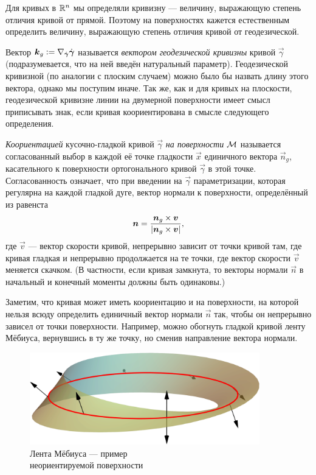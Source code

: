 Для кривых в $\R^n$ мы определяли кривизну --- величину, выражающую степень отличия кривой от прямой. Поэтому на поверхностях кажется естественным определить величину, выражающую степень отличия кривой от геодезической.

Вектор $\vec{k}_g \vcentcolon = \nabla_{\dot{\vec{\gamma}}}\dot{\vec{\gamma}}$ называется \textit{вектором геодезической кривизны} кривой $\vec{\gamma}$ (подразумевается, что на ней введён натуральный параметр). Геодезической кривизной (по аналогии с плоским случаем) можно было бы назвать длину этого вектора, однако мы поступим иначе. Так же, как и для кривых на плоскости, геодезической кривизне линии на двумерной поверхности имеет смысл приписывать знак, если кривая коориентирована в смысле следующего определения.

\begin{definition}
	\textit{Коориентацией} кусочно-гладкой кривой $\vec{\gamma}$ \textit{на поверхности} $\M$ называется согласованный выбор в каждой её точке гладкости $\vec{x}$ единичного вектора $\vec{n}_g$, касательного к поверхности ортогонального кривой $\vec{\gamma}$ в этой точке. Согласованность означает, что при введении на $\vec{\gamma}$ параметризации, которая регулярна на каждой гладкой дуге, вектор нормали к поверхности, определённый из равенста
	\[
		\vec{n} = \frac{\vec{n}_g \times \vec{v}}{\abs{\vec{n}_g \times \vec{v}}},
	\]
	где $\vec{v}$ --- вектор скорости кривой, непрерывно зависит от точки кривой там, где кривая гладкая и непрерывно продолжается на те точки, где вектор скорости $\vec{v}$ меняется скачком. (В частности, если кривая замкнута, то векторы нормали $\vec{n}$ в начальный и конечный моменты должны быть одинаковы.)
\end{definition}

Заметим, что кривая может иметь коориентацию и на поверхности, на которой нельзя всюду определить единичный вектор нормали $\vec{n}$ так, чтобы он непрерывно зависел от точки поверхности. Например, можно обогнуть гладкой кривой ленту Мёбиуса, вернувшись в ту же точку, но сменив направление вектора нормали.

\begin{figure}[H]
	\centering
	\includegraphics[width=10cm]{./img/MobiusStrip.pdf}
	\caption{Лента Мёбиуса --- пример\\ неориентируемой поверхности}
\end{figure} %

